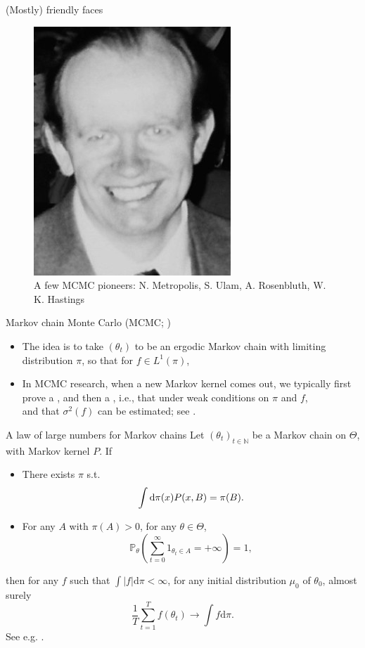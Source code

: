 \documentclass[10pt]{beamer}
\let\oldcitep=\citep
\renewcommand\citep[1]{\hyperlink{#1}{\textcolor{vert}{\oldcitep{#1}}}}
\begin{document}
\begin{frame}{(Mostly) friendly faces}
\begin{figure}
  \includegraphics[height=.3\textheight]{Figures/hastings}
  \caption{A few MCMC pioneers: N. Metropolis, S. Ulam, A. Rosenbluth, W. K. Hastings}
\end{figure}\end{frame}

\begin{frame}{Markov chain Monte Carlo (MCMC; \citep{RoCa04})}
\begin{itemize}
  \item The idea is to take $(\theta_t)$ to be an ergodic Markov chain with limiting distribution $\pi$, so that for $f\in L^1(\pi)$,
  $$$$
  \vfill
  \item In MCMC research, when a new Markov kernel comes out, we typically first prove a , and then a , i.e., that under weak conditions on $\pi$ and $f$,
  $$$$
  \vfill
  and that $\sigma^2(f)$ can be estimated; see \citep{DoMoSt14}.
  \end{itemize}
\end{frame}

\begin{frame}{A law of large numbers for Markov chains}
  Let $(\theta_t)_{t\in\mathbb N}$ be a Markov chain on $\Theta$, with Markov kernel $P$. If
  \begin{itemize}
    \item There exists $\pi$ s.t. 
    $$
    \int {\rm d}\pi(x) P(x, B) = \pi(B).
    $$
    \item For any $A$ with $\pi(A)>0$, for any $\theta\in \Theta$,
    $$ 
    \mathbb{P}_{\theta} \left(\sum_{t=0}^\infty 1_{\theta_t\in A} = +\infty\right) = 1,
    $$
  \end{itemize}
  then for any $f$ such that $\int \vert f\vert \mathrm{d} \pi <\infty$, for any initial distribution $\mu_0$ of $\theta_0$, almost surely
  $$
  \frac{1}{T} \sum_{t=1}^T f(\theta_t) \rightarrow \int f\mathrm{d}\pi.
  $$
  See e.g. \citep{DoMoSt14}.
\end{frame}
\end{document}
